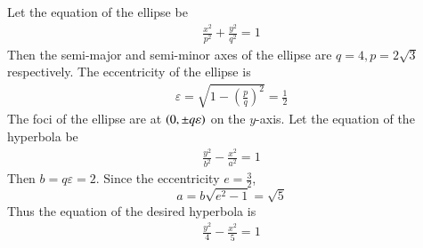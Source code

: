 %
Let the equation of the ellipse be 
%
\begin{align}
\frac{x^2}{p^2}+ \frac{y^2}{q^2} = 1
\end{align}
%
Then the semi-major and semi-minor axes of the ellipse are $q=4,p = 2\sqrt{3}$ respectively.  The eccentricity of the ellipse is
%
\begin{align}
\varepsilon ={\sqrt {1-\left({\frac {p}{q}}\right)^{2}}} = \frac{1}{2}
\end{align}
%
The foci of the ellipse are at $\left(0,\pm q\varepsilon\right)$ on the $y$-axis.  
Let the equation of the hyperbola be
%
\begin{align}
\frac{y^2}{b^2} - \frac{x^2}{a^2} = 1
\end{align}
%
Then $b = q\varepsilon = 2$. Since the eccentricity $e = \frac{3}{2}$, 
%
\begin{equation}
a = b \sqrt{e^2- 1 } = \sqrt{5}
\end{equation}
%
Thus the equation of the desired hyperbola is
%
\begin{align}
\frac{y^2}{4} - \frac{x^2}{5} = 1
\end{align}
%
